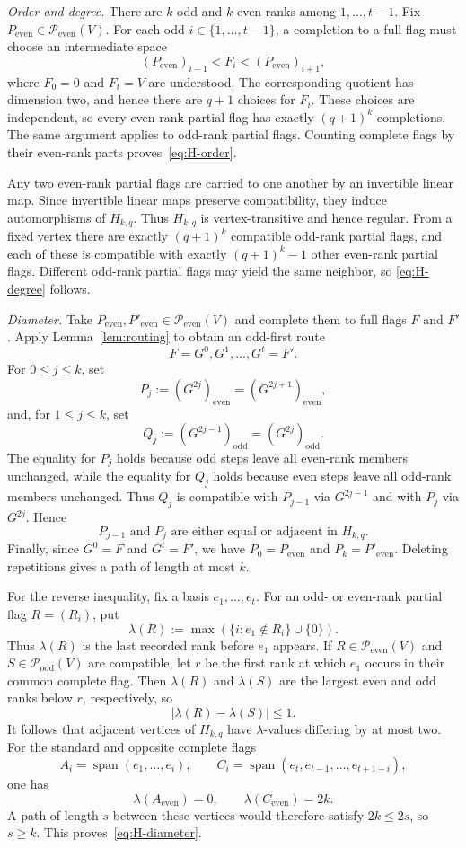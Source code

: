 \documentclass[10pt,a4paper]{amsart}
\makeatletter
\renewenvironment{proof}[1][\proofname]
{\par\pushQED{\qed}
	\normalfont\topsep6\p@\@plus6\p@\relax\trivlist
	\item[\hskip\labelsep\bfseries#1\@addpunct{.}]
	\ignorespaces}
\makeatother
\begin{document}
\begin{proof}
\smallskip
\noindent\emph{Order and degree.}
There are $k$ odd and $k$ even ranks among $1,\ldots,t-1$.  Fix
$P_{\mathrm{even}}\in\mathcal P_{\mathrm{even}}(V)$.  For each odd
$i\in\{1,\ldots,t-1\}$, a completion to a full flag must choose an
intermediate space
$$(P_{\mathrm{even}})_{i-1}<F_i<(P_{\mathrm{even}})_{i+1},$$
where $F_0=0$ and $F_t=V$ are understood.  The corresponding quotient has dimension two, and hence there are $q+1$ choices for $F_i$.  These choices are independent, so every even-rank partial flag has exactly $(q+1)^k$ completions.  The same argument applies to odd-rank partial flags.  Counting complete flags by their even-rank parts proves~\eqref{eq:H-order}.

Any two even-rank partial flags are carried to one another by an invertible linear map.  Since invertible linear maps preserve compatibility, they induce automorphisms of $H_{k,q}$.  Thus $H_{k,q}$ is vertex-transitive and hence regular.  From a fixed vertex there are exactly $(q+1)^k$ compatible odd-rank partial flags, and each of these is compatible with exactly $(q+1)^k-1$ other even-rank partial flags.  Different odd-rank partial flags may yield the same neighbor, so \eqref{eq:H-degree} follows.

\smallskip
\noindent\emph{Diameter.}
Take $P_{\mathrm{even}},P'_{\mathrm{even}}
\in\mathcal P_{\mathrm{even}}(V)$ and complete them to full flags $F$ and $F'$.  Apply Lemma~\ref{lem:routing} to obtain an odd-first route
$$F=G^0,G^1,\ldots,G^t=F'.$$
For $0\le j\le k$, set
$$P_j:=(G^{2j})_{\mathrm{even}}
      =(G^{2j+1})_{\mathrm{even}},$$
and, for $1\le j\le k$, set
$$Q_j:=(G^{2j-1})_{\mathrm{odd}}
      =(G^{2j})_{\mathrm{odd}}.$$
The equality for $P_j$ holds because odd steps leave all even-rank
members unchanged, while the equality for $Q_j$ holds because even
steps leave all odd-rank members unchanged. Thus $Q_j$ is compatible
with $P_{j-1}$ via $G^{2j-1}$ and with $P_j$ via $G^{2j}$. Hence
$$  P_{j-1} \text{ and } P_j \text{ are either equal or adjacent in } H_{k,q}.$$
Finally, since $G^0=F$ and $G^t=F'$, we have
$P_0=P_{\mathrm{even}}$ and $P_k=P'_{\mathrm{even}}$.
Deleting repetitions gives a path of length at most $k$.

For the reverse inequality, fix a basis $e_1,\ldots,e_t$.  For an odd- or even-rank partial flag $R=(R_i)$, put
$$\lambda(R):=\max\left(\{i:e_1\notin R_i\}\cup\{0\}\right).$$
Thus $\lambda(R)$ is the last recorded rank before $e_1$ appears.  If
$R\in\mathcal P_{\mathrm{even}}(V)$ and $S\in\mathcal P_{\mathrm{odd}}(V)$ are compatible, let $r$ be the first rank at which $e_1$ occurs in their common complete flag.  Then $\lambda(R)$ and $\lambda(S)$ are the largest even and odd ranks below $r$, respectively, so
$$|\lambda(R)-\lambda(S)|\le1.$$
It follows that adjacent vertices of $H_{k,q}$ have $\lambda$-values
differing by at most two.  For the standard and opposite complete flags
$$A_i=\operatorname{span}(e_1,\ldots,e_i),
  \qquad
  C_i=\operatorname{span}(e_t,e_{t-1},\ldots,e_{t+1-i}),$$
one has
$$\lambda(A_{\mathrm{even}})=0,
  \qquad
  \lambda(C_{\mathrm{even}})=2k.$$
A path of length $s$ between these vertices would therefore satisfy $2k\le2s$, so $s\ge k$.  This proves~\eqref{eq:H-diameter}.


\end{proof}
\end{document}
